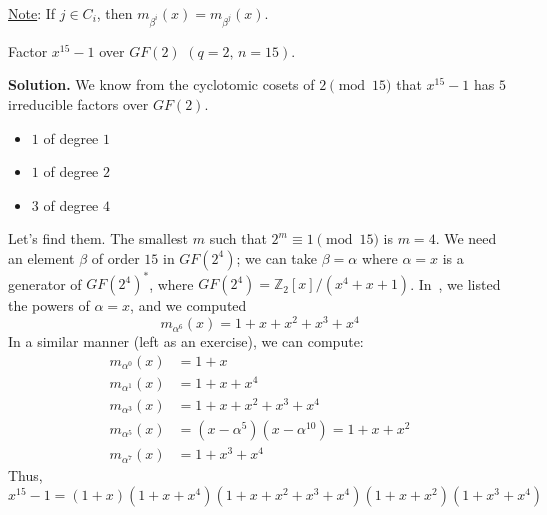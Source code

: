 \underline{Note}: If $ j\in C_i $, then $ m_{\beta^i}(x)=m_{\beta^j}(x) $.


\begin{Example}{}{}
    Factor $ x^{15}-1 $ over $ GF(2) $ $ (q=2,\,n=15) $.

    \textbf{Solution.} We know from the cyclotomic cosets
    of $ 2\pmod{15} $ that $ x^{15}-1 $ has $ 5 $ irreducible
    factors over $ GF(2) $.
    \begin{itemize}
        \item $ 1 $ of degree $ 1 $
        \item $ 1 $ of degree $ 2 $
        \item $ 3 $ of degree $ 4 $
    \end{itemize}
    Let's find them. The smallest $ m $ such that
    $ 2^m\equiv 1\pmod{15} $ is $ m=4 $. We need an element
    $ \beta $ of order $ 15 $ in $ GF(2^4) $; we can
    take $ \beta=\alpha $ where $ \alpha=x $
    is a generator of $ GF(2^4)^* $, where
    $ GF(2^4)=\mathbb{Z}_2[x]/(x^4+x+1) $. In~,
    we listed the powers of $ \alpha=x $, and we computed
    \[ m_{\alpha^6}(x)=1+x+x^2+x^3+x^4 \]
    In a similar manner (left as an exercise), we can compute:
    \begin{align*}
        m_{\alpha^0}(x) & =1+x                                 \\
        m_{\alpha^1}(x) & =1+x+x^4                             \\
        m_{\alpha^3}(x) & =1+x+x^2+x^3+x^4                     \\
        m_{\alpha^5}(x) & =(x-\alpha^5)(x-\alpha^{10})=1+x+x^2 \\
        m_{\alpha^7}(x) & =1+x^3+x^4
    \end{align*}
    Thus,
    \[ x^{15}-1=(1+x)(1+x+x^4)(1+x+x^2+x^3+x^4)(1+x+x^2)(1+x^3+x^4) \]
\end{Example}



